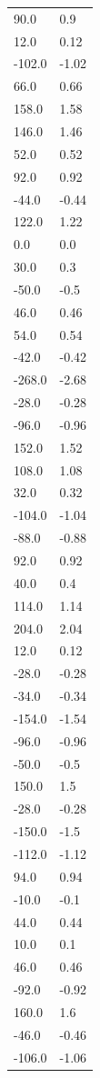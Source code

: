 \begin{longtable}{ll}
90.0 & 0.9 \\
12.0 & 0.12 \\
-102.0 & -1.02 \\
66.0 & 0.66 \\
158.0 & 1.58 \\
146.0 & 1.46 \\
52.0 & 0.52 \\
92.0 & 0.92 \\
-44.0 & -0.44 \\
122.0 & 1.22 \\
0.0 & 0.0 \\
30.0 & 0.3 \\
-50.0 & -0.5 \\
46.0 & 0.46 \\
54.0 & 0.54 \\
-42.0 & -0.42 \\
-268.0 & -2.68 \\
-28.0 & -0.28 \\
-96.0 & -0.96 \\
152.0 & 1.52 \\
108.0 & 1.08 \\
32.0 & 0.32 \\
-104.0 & -1.04 \\
-88.0 & -0.88 \\
92.0 & 0.92 \\
40.0 & 0.4 \\
114.0 & 1.14 \\
204.0 & 2.04 \\
12.0 & 0.12 \\
-28.0 & -0.28 \\
-34.0 & -0.34 \\
-154.0 & -1.54 \\
-96.0 & -0.96 \\
-50.0 & -0.5 \\
150.0 & 1.5 \\
-28.0 & -0.28 \\
-150.0 & -1.5 \\
-112.0 & -1.12 \\
94.0 & 0.94 \\
-10.0 & -0.1 \\
44.0 & 0.44 \\
10.0 & 0.1 \\
46.0 & 0.46 \\
-92.0 & -0.92 \\
160.0 & 1.6 \\
-46.0 & -0.46 \\
-106.0 & -1.06 \\

\end{longtable}
